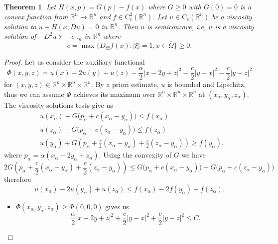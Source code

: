 \documentclass[12pt,reqno]{amsart}
\numberwithin{figure}{section}
\theoremstyle{plain}
\newtheorem{thm}{Theorem}[section]
\theoremstyle{remark}
\numberwithin{equation}{section}
\newcommand{\R}{\mathbb{R}}
\begin{document}
\begin{appendices}
\begin{thm}\label{convex} Let $H(x,p) = G(p)-f(x)$ where $G\geq 0$ with $G(0) = 0$ is a convex function from $\R^n\to\R^n$ and $f\in \mathrm{C}^2_c(\R^n)$. Let $u\in \mathrm{C}_c(\R^n)$ be a viscosity solution to $u+H(x,Du) = 0$ in $\R^n$. Then $u$ is semiconcave, i.e, $u$ is a viscosity solution of  $-D^2u \succ -c\;\mathbb{I}_n$ in $\R^n$ where 
\begin{equation*}
    c = \max \big\lbrace  D_{\xi\xi}f(x): |\xi|=1, x\in \overline{\Omega} \big\rbrace\geq 0.
\end{equation*}
\end{thm}
\begin{proof} Let us consider the auxiliary functional
\begin{equation*}
    \Phi(x,y,z) = u(x)-2u(y)+u(z) - \frac{\alpha}{2}|x-2y+z|^2 - \frac{c}{2}|y-x|^2-\frac{c}{2}|y-z|^2
\end{equation*}
for $(x,y,z)\in \R^n\times\R^n\times\R^n$. By a priori estimate, $u$ is bounded and Lipschitz, thus we can assume $\Phi$ achieves its maximum over $\R^n\times\R^n\times \R^n$ at $(x_\alpha,y_\alpha,z_\alpha)$. The viscosity solutions tests give us
\begin{align*}
    &u(x_\alpha) + G\big(p_\alpha+c(x_\alpha-y_\alpha)\big) \leq f(x_\alpha)\\
    &u(z_\alpha) + G\big(p_\alpha+c(z_\alpha-y_\alpha)\big) \leq f(z_\alpha)\\
    &u(y_\alpha) + G\left(p_\alpha+\frac{c}{2}(x_\alpha-y_\alpha) + \frac{c}{2}(z_\alpha-y_\alpha)\right) \geq f(y_\alpha),
\end{align*}
where $p_\alpha = \alpha(x_\alpha-2y_\alpha+z_\alpha)$. Using the convexity of $G$ we have
\begin{equation*}
    2G\left(p_\alpha+\frac{c}{2}(x_\alpha-y_\alpha) + \frac{c}{2}(z_\alpha-y_\alpha)\right) \leq G\big(p_\alpha+c(x_\alpha-y_\alpha)\big)  + G\big(p_\alpha+c(z_\alpha-y_\alpha)\big)
\end{equation*}
therefore
\begin{equation*}
    u(x_\alpha) - 2u(y_\alpha) + u(z_\alpha) \leq f(x_\alpha) - 2f(y_\alpha) + f(z_\alpha).
\end{equation*}
\begin{itemize}
    \item $\Phi(x_\alpha,y_\alpha,z_\alpha)\geq \Phi(0,0,0)$ gives us
    \begin{equation*}
        \frac{\alpha}{2}|x-2y+z|^2 + \frac{c}{2}|y-x|^2+\frac{c}{2}|y-z|^2 \leq C.
    \end{equation*}

\end{itemize}
\end{proof}
\end{appendices}
\end{document}
